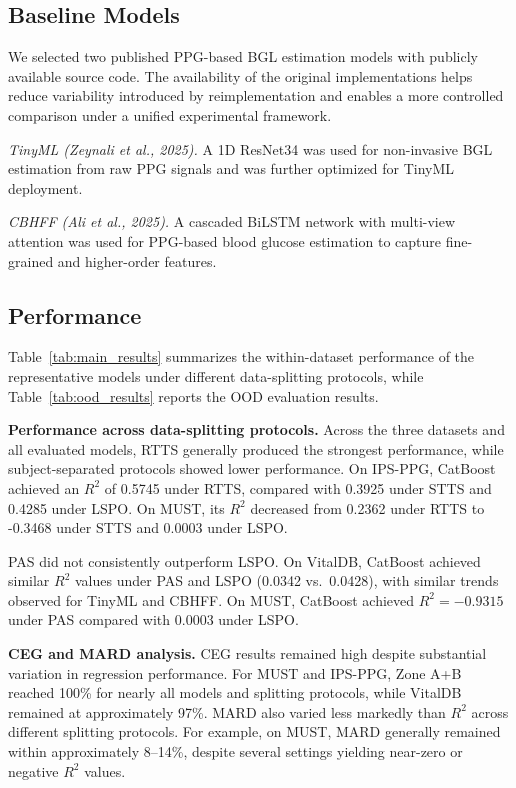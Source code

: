 \documentclass{article}
\begin{document}
\subsection{Baseline Models}
We selected two published PPG-based BGL estimation models with publicly available source code. The availability of the original implementations helps reduce variability introduced by reimplementation and enables a more controlled comparison under a unified experimental framework.

\textit{TinyML (Zeynali et al., 2025).} A 1D ResNet34 was used for non-invasive BGL estimation from raw PPG signals and was further optimized for TinyML deployment.

\textit{CBHFF (Ali et al., 2025).} A cascaded BiLSTM network with multi-view attention was used for PPG-based blood glucose estimation to capture fine-grained and higher-order features.

\subsection{Performance}
\label{sec:performance}

Table~\ref{tab:main_results} summarizes the within-dataset performance of the representative models under different data-splitting protocols, while Table~\ref{tab:ood_results} reports the OOD evaluation results.


\textbf{Performance across data-splitting protocols.}
Across the three datasets and all evaluated models, RTTS generally produced the strongest performance, while subject-separated protocols showed lower performance. On IPS-PPG, CatBoost achieved an $R^2$ of 0.5745 under RTTS, compared with 0.3925 under STTS and 0.4285 under LSPO. On MUST, its $R^2$ decreased from 0.2362 under RTTS to -0.3468 under STTS and 0.0003 under LSPO.

PAS did not consistently outperform LSPO. On VitalDB, CatBoost achieved similar $R^2$ values under PAS and LSPO (0.0342 vs.\ 0.0428), with similar trends observed for TinyML and CBHFF. On MUST, CatBoost achieved $R^2=-0.9315$ under PAS compared with 0.0003 under LSPO.

\textbf{CEG and MARD analysis.}
CEG results remained high despite substantial variation in regression performance. For MUST and IPS-PPG, Zone A+B reached 100\% for nearly all models and splitting protocols, while VitalDB remained at approximately 97\%. MARD also varied less markedly than $R^2$ across different splitting protocols. For example, on MUST, MARD generally remained within approximately 8--14\%, despite several settings yielding near-zero or negative $R^2$ values.
\end{document}
